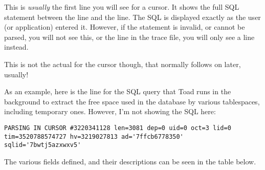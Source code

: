 This is \emph{usually} the first line you will see for a cursor. It shows the full SQL statement between the  line and the  line. The SQL is displayed exactly as the user (or application) entered it. However, if the statement is invalid, or cannot be parsed, you will not see this, or the  line in the trace file, you will only see a  line instead.

This is not the actual  for the cursor though, that normally follows on later, usually!

As an example, here is the  line for the SQL query that Toad runs in the background to extract the free space used in the database by various tablespaces, including temporary ones. However, I'm not showing the SQL here:

\begin{lstlisting}[numbers=none,caption={Parsing In Cursor Line}]
PARSING IN CURSOR #3220341128 len=3081 dep=0 uid=0 oct=3 lid=0 tim=3520788574727 hv=3219027813 ad='7ffcb6778350' sqlid='7bwtj5azxwxv5'
\end{lstlisting}

The various fields defined, and their descriptions can be seen in the table below.

